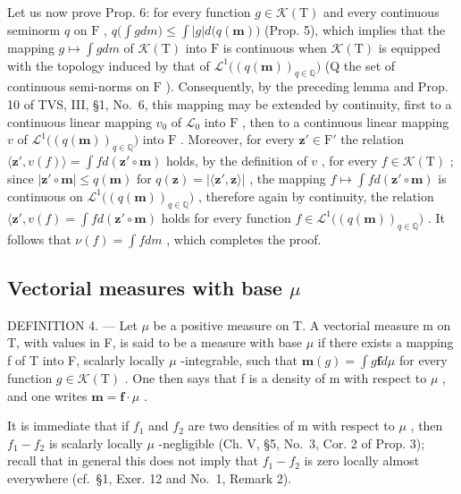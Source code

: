 Let us now prove Prop. 6: for every function \(g \in \mathcal{K}(\mathrm{T})\) and every continuous seminorm \(q\) on \(\mathrm{F}\) , \(q\big(\int g dm\big) \leqslant \int |g| d\big(q(\mathbf{m})\big)\) (Prop. 5), which implies that the mapping \(g \mapsto \int g dm\) of \(\mathcal{K}(\mathrm{T})\) into \(\mathrm{F}\) is continuous when \(\mathcal{K}(\mathrm{T})\) is equipped with the topology induced by that of \(\mathcal{L}^1\big((q(\mathbf{m}))_{q \in \mathbb{Q}}\big)\) (Q the set of continuous semi-norms on \(\mathrm{F}\) ). Consequently, by the preceding lemma and Prop. 10 of TVS, III, §1, No.~6, this mapping may be extended by continuity, first to a continuous linear mapping \(v_0\) of \(\mathcal{L}_0\) into \(\mathrm{F}\) , then to a continuous linear mapping \(v\) of \(\mathcal{L}^1\big((q(\mathbf{m}))_{q \in \mathbb{Q}}\big)\) into \(\mathrm{F}\) . Moreover, for every \(\mathbf{z}' \in \mathrm{F}'\) the relation \(\langle \mathbf{z}', v(f) \rangle = \int f d(\mathbf{z}' \circ \mathbf{m})\) holds, by the definition of \(v\) , for every \(f \in \mathcal{K}(\mathrm{T})\) ; since \(|\mathbf{z}' \circ \mathbf{m}| \leqslant q(\mathbf{m})\) for \(q(\mathbf{z}) = |\langle \mathbf{z}', \mathbf{z} \rangle|\) , the mapping \(f \mapsto \int f d(\mathbf{z}' \circ \mathbf{m})\) is continuous on \(\mathcal{L}^1\big((q(\mathbf{m}))_{q \in \mathbb{Q}}\big)\) , therefore again by continuity, the relation \(\langle \mathbf{z}', v(f) = \int f d(\mathbf{z}' \circ \mathbf{m})\) holds for every function \(f \in \mathcal{L}^1\big((q(\mathbf{m}))_{q \in \mathbb{Q}}\big)\) . It follows that \(\nu(f) = \int f dm\) , which completes the proof.

\subsection{\texorpdfstring{Vectorial measures with base \(\mu\)}{Vectorial measures with base mu}}

DEFINITION 4. --- Let \(\mu\) be a positive measure on T. A vectorial measure m on T, with values in F, is said to be a measure with base \(\mu\) if there exists a mapping f of T into F, scalarly locally \(\mu\) -integrable, such that \(\mathbf{m}(g) = \int g\mathbf{f}d\mu\) for every function \(g \in \mathcal{K}(\mathrm{T})\) . One then says that f is a density of m with respect to \(\mu\) , and one writes \(\mathbf{m} = \mathbf{f} \cdot \mu\) .

It is immediate that if \(f_{1}\) and \(f_{2}\) are two densities of m with respect to \(\mu\) , then \(f_{1}-f_{2}\) is scalarly locally \(\mu\) -negligible (Ch. V, §5, No.~3, Cor. 2 of Prop. 3); recall that in general this does not imply that \(f_{1}-f_{2}\) is zero locally almost everywhere (cf.~§1, Exer. 12 and No.~1, Remark 2).

